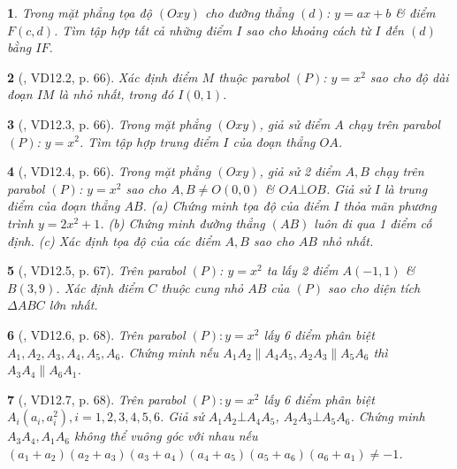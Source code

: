 \documentclass{article}
\newtheorem{baitoan}{}
\begin{document}
\begin{baitoan}
	Trong mặt phẳng tọa độ $(Oxy)$ cho đường thẳng $(d)$: $y = ax + b$ \& điểm $F(c,d)$. Tìm tập hợp tất cả những điểm $I$ sao cho khoảng cách từ $I$ đến $(d)$ bằng $IF$.
\end{baitoan}

\begin{baitoan}[\cite{TLCT_THCS_Toan_9_dai_so}, VD12.2, p. 66]
	Xác định điểm $M$ thuộc parabol $(P)$: $y = x^2$ sao cho độ dài đoạn $IM$ là nhỏ nhất, trong đó $I(0,1)$.
\end{baitoan}

\begin{baitoan}[\cite{TLCT_THCS_Toan_9_dai_so}, VD12.3, p. 66]
	Trong mặt phẳng $(Oxy)$, giả sử điểm $A$ chạy trên parabol $(P)$: $y = x^2$. Tìm tập hợp trung điểm $I$ của đoạn thẳng $OA$.
\end{baitoan}

\begin{baitoan}[\cite{TLCT_THCS_Toan_9_dai_so}, VD12.4, p. 66]
	Trong mặt phẳng $(Oxy)$, giả sử 2 điểm $A,B$ chạy trên parabol $(P)$: $y = x^2$ sao cho $A,B\ne O(0,0)$ \& $OA\bot OB$. Giả sử $I$ là trung điểm của đoạn thẳng $AB$. (a) Chứng minh tọa độ của điểm $I$ thỏa mãn phương trình $y = 2x^2 + 1$. (b) Chứng minh đường thẳng $(AB)$ luôn đi qua 1 điểm cố định. (c) Xác định tọa độ của các điểm $A,B$ sao cho $AB$ nhỏ nhất.
\end{baitoan}

\begin{baitoan}[\cite{TLCT_THCS_Toan_9_dai_so}, VD12.5, p. 67]
	Trên parabol $(P)$: $y = x^2$ ta lấy 2 điểm $A(-1,1)$ \& $B(3,9)$. Xác định điểm $C$ thuộc cung nhỏ $AB$ của $(P)$ sao cho diện tích $\Delta ABC$ lớn nhất.
\end{baitoan}

\begin{baitoan}[\cite{TLCT_THCS_Toan_9_dai_so}, VD12.6, p. 68]
	Trên parabol $(P):y = x^2$ lấy 6 điểm phân biệt $A_1,A_2,A_3,A_4,A_5,A_6$. Chứng minh nếu $A_1A_2\parallel A_4A_5,A_2A_3\parallel A_5A_6$ thì $A_3A_4\parallel A_6A_1$.
\end{baitoan}

\begin{baitoan}[\cite{TLCT_THCS_Toan_9_dai_so}, VD12.7, p. 68]
	Trên parabol $(P):y = x^2$ lấy 6 điểm phân biệt $A_i(a_i,a_i^2),i = 1,2,3,4,5,6$. Giả sử $A_1A_2\bot A_4A_5$, $A_2A_3\bot A_5A_6$. Chứng minh $A_3A_4,A_1A_6$ không thể vuông góc với nhau nếu $(a_1 + a_2)(a_2 + a_3)(a_3 + a_4)(a_4 + a_5)(a_5 + a_6)(a_6 + a_1)\ne-1$.
\end{baitoan}
\end{document}
